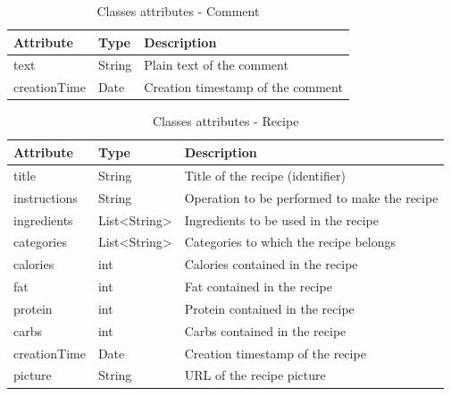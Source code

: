\documentclass[a4paper]{report}
\begin{document}
\begin{table}[htpb]
\caption{Classes attributes - Comment}
\centering
\begin{tabular}{|l|l|l|}
\hline
\rowcolor[HTML]{000000} 
{\color[HTML]{FFFFFF} Attribute} & {\color[HTML]{FFFFFF} Type} & {\color[HTML]{FFFFFF} Description} \\ \hline
text                             & String                      & Plain text of the comment          \\ \hline
creationTime                     & Date                        & Creation timestamp of the comment  \\ \hline
\end{tabular}
\end{table}

\begin{table}[]
	\caption{Classes attributes - Recipe}
	\centering
	\begin{tabular}{|l|l|l|}
		\hline
		\rowcolor[HTML]{000000} 
		{\color[HTML]{FFFFFF} Attribute} & {\color[HTML]{FFFFFF} Type}         & {\color[HTML]{FFFFFF} Description}           \\ \hline
		title                            & String                              & Title of the recipe (identifier)             \\ \hline
		instructions                     & String                              & Operation to be performed to make the recipe \\ \hline
		ingredients                      & List\textless{}String\textgreater{} & Ingredients to be used in the recipe         \\ \hline
		categories                       & List\textless{}String\textgreater{} & Categories to which the recipe belongs       \\ \hline
		calories                         & int                                 & Calories contained in the recipe             \\ \hline
		fat                              & int                                 & Fat contained in the recipe                  \\ \hline
		protein                          & int                                 & Protein contained in the recipe              \\ \hline
		carbs                            & int                                 & Carbs contained in the recipe                \\ \hline
		creationTime                     & Date                                & Creation timestamp of the recipe             \\ \hline
		picture                          & String                              & URL of the recipe picture                    \\ \hline
	\end{tabular}
\end{table}
\end{document}
